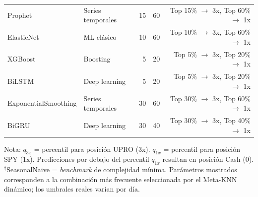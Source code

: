 \begin{table}[htbp]
\begin{tabular}{@{}llrrr@{}}
Prophet & Series temporales & 15 & 60 & Top 15\% $\rightarrow$ 3x, Top 60\% $\rightarrow$ 1x \\
ElasticNet & ML cl\'asico & 10 & 60 & Top 10\% $\rightarrow$ 3x, Top 60\% $\rightarrow$ 1x \\
XGBoost & Boosting & 5 & 20 & Top 5\% $\rightarrow$ 3x, Top 20\% $\rightarrow$ 1x \\
BiLSTM & Deep learning & 5 & 20 & Top 5\% $\rightarrow$ 3x, Top 20\% $\rightarrow$ 1x \\
ExponentialSmoothing & Series temporales & 30 & 60 & Top 30\% $\rightarrow$ 3x, Top 60\% $\rightarrow$ 1x \\
BiGRU & Deep learning & 30 & 40 & Top 30\% $\rightarrow$ 3x, Top 40\% $\rightarrow$ 1x \\
\bottomrule
\end{tabular}
\begin{tablenotes}
\small
\item Nota: $q_{3x}$ = percentil para posici\'on UPRO (3x). $q_{1x}$ = percentil para posici\'on SPY (1x). Predicciones por debajo del percentil $q_{1x}$ resultan en posici\'on Cash (0). \colorbox{naivebg}{$^\dagger$SeasonalNaive} = \textit{benchmark} de complejidad m\'inima. Par\'ametros mostrados corresponden a la combinaci\'on m\'as frecuente seleccionada por el Meta-KNN din\'amico; los umbrales reales var\'ian por d\'ia.
\end{tablenotes}
\end{table}
